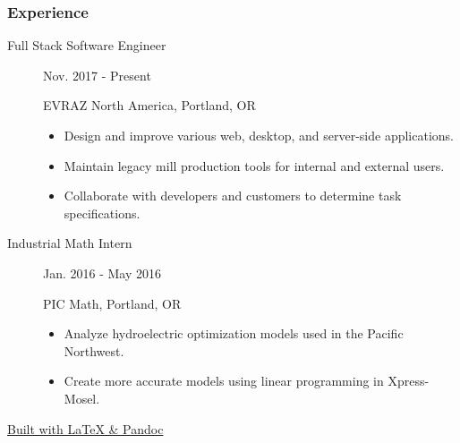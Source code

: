 \documentclass{article}
\begin{document}

\subsubsection*{Experience}

    \begin{description}
		
		\item[Full Stack Software Engineer] \hfill Nov. 2017 - Present
		
		EVRAZ North America, Portland, OR
		\begin{itemize}
			\item Design and improve various web, desktop, and server-side applications.
			\item Maintain legacy mill production tools for internal and external users.
			\item Collaborate with developers and customers to determine task specifications.
		\end{itemize}
		
		\vspace{0.5em}
		
        \item[Industrial Math Intern] \hfill Jan. 2016 - May 2016
        
        PIC Math, Portland, OR
        \begin{itemize}
            \item Analyze hydroelectric optimization models used in the Pacific Northwest.
            \item Create more accurate models using linear programming in Xpress-Mosel.
        \end{itemize}

        
    \end{description}
    
    \begin{center}
	\vspace{.25in}
    \href{https://www.github.com/BurnsCommaLucas/Resume}{\tiny Built with \LaTeX \hspace{0.001in} \& Pandoc}
    \end{center}
\end{document}
